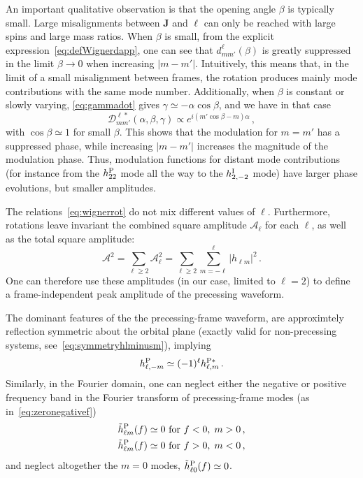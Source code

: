 \documentclass[aps,showpacs,twocolumn,
prd,superscriptaddress,nofootinbib]{revtex4-1}
\newcommand{\be}{\begin{equation}}
\newcommand{\ee}{\end{equation}}
\newcommand\calD{{\mathcal{D}}}
\newcommand\calA{{\mathcal{A}}}
\newcommand{\nn}{\nonumber}
\begin{document}
An important qualitative observation is that the opening angle $\beta$ is typically small. Large misalignments between $\bm{J}$ and $\bm{\ell}$ can only be reached with large spins and large mass ratios. When $\beta$ is small, from the explicit expression~\eqref{eq:defWignerdapp}, one can see that $d^{\ell}_{mm'}(\beta)$ is greatly suppressed in the limit $\beta \rightarrow 0$ when increasing $|m-m'|$. Intuitively, this means that, in the limit of a small misalignment between frames, the rotation produces mainly mode contributions with the same mode number. Additionally, when $\beta$ is constant or slowly varying, \eqref{eq:gammadot} gives $\gamma \simeq - \alpha \cos\beta$, and we have in that case
\be\label{eq:wignerphasesimpleprec}
	\calD^{\ell *}_{mm'} (\alpha, \beta, \gamma) \propto e^{i(m' \cos\beta - m) \alpha} \,,
\ee
with $\cos\beta \simeq 1$ for small $\beta$. This shows that the modulation for $m=m'$ has a suppressed phase, while increasing $|m-m'|$ increases the magnitude of the modulation phase. Thus, modulation functions for distant mode contributions (for instance from the $h^{\rm P}_{22}$ mode all the way to the $h^{\rm I}_{2,-2}$ mode) have larger phase evolutions, but smaller amplitudes.

The relations~\eqref{eq:wignerrot} do not mix different values of $\ell$. Furthermore, rotations leave invariant the combined square amplitude $\calA_{\ell}$ for each $\ell$, as well as the total square amplitude:
\be\label{eq:defsumamplitude}
	\calA^{2} = \sum\limits_{\ell \geq 2}\calA_{\ell}^{2} = \sum\limits_{\ell \geq 2}\sum\limits_{m=-\ell}^{\ell} |h_{\ell m}|^{2} \,.
\ee
One can therefore use these amplitudes (in our case, limited to $\ell = 2$) to define a frame-independent peak amplitude of the precessing waveform.

The dominant features of the the precessing-frame waveform, are approximtely reflection symmetric about the orbital plane (exactly valid for non-precessing systems, see~\eqref{eq:symmetryhlminusm}), implying
\be\label{eq:approxsymmetryhlminusm}
	h^{\rm P}_{\ell,-m} \simeq (-1)^{\ell} h^{\rm P*}_{\ell,m} \,.
\ee
Similarly, in the Fourier domain, one can neglect either the negative or positive frequency band in the Fourier transform of precessing-frame modes (as in~\eqref{eq:zeronegativef})
\begin{align}\label{eq:approxzeronegativef}
	\tilde{h}_{\ell m}^{\rm P} (f) &\simeq 0 \text{ for } f<0, \; m>0 \nn\,,\\
	\tilde{h}_{\ell m}^{\rm P} (f) &\simeq 0 \text{ for } f>0, \; m<0 \,,
\end{align}
and neglect altogether the $m=0$ modes, $\tilde{h}_{\ell 0}^{\rm P} (f) \simeq 0$.
\end{document}
